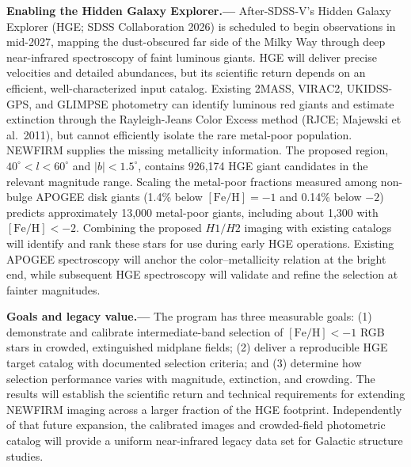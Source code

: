 \documentclass[11pt]{article}
\begin{document}
\smallskip
\noindent\textbf{Enabling the Hidden Galaxy Explorer.---}
After-SDSS-V's Hidden Galaxy Explorer (HGE; SDSS Collaboration 2026) is scheduled to begin observations in mid-2027, mapping the dust-obscured far side of the Milky Way through deep near-infrared spectroscopy of faint luminous giants. HGE will deliver precise velocities and detailed abundances, but its scientific return depends on an efficient, well-characterized input catalog. Existing 2MASS, VIRAC2, UKIDSS-GPS, and GLIMPSE photometry can identify luminous red giants and estimate extinction through the Rayleigh-Jeans Color Excess method (RJCE; Majewski et al.\ 2011), but cannot efficiently isolate the rare metal-poor population. NEWFIRM supplies the missing metallicity information.
The proposed region, $40^\circ<l<60^\circ$ and $|b|<1.5^\circ$, contains 926,174 HGE giant candidates in the relevant magnitude range. Scaling the metal-poor fractions measured among non-bulge APOGEE disk giants (1.4\% below $[\mathrm{Fe/H}]=-1$ and 0.14\% below $-2$) predicts approximately 13,000 metal-poor giants, including about 1,300 with $[\mathrm{Fe/H}]<-2$.
Combining the proposed $H1/H2$ imaging with existing catalogs will identify and rank these stars for use during early HGE operations. Existing APOGEE spectroscopy will anchor the color--metallicity relation at the bright end, while subsequent HGE spectroscopy will validate and refine the selection at fainter magnitudes.

\smallskip
\noindent\textbf{Goals and legacy value.---}
The program has three measurable goals: (1) demonstrate and calibrate intermediate-band selection of $[\mathrm{Fe/H}]<-1$ RGB stars in crowded, extinguished midplane fields; (2) deliver a reproducible HGE target catalog with documented selection criteria; and (3) determine how selection performance varies with magnitude, extinction, and crowding. The results will establish the scientific return and technical requirements for extending NEWFIRM imaging across a larger fraction of the HGE footprint. Independently of that future expansion, the calibrated images and crowded-field photometric catalog will provide a uniform near-infrared legacy data set for Galactic structure studies.

\end{document}
